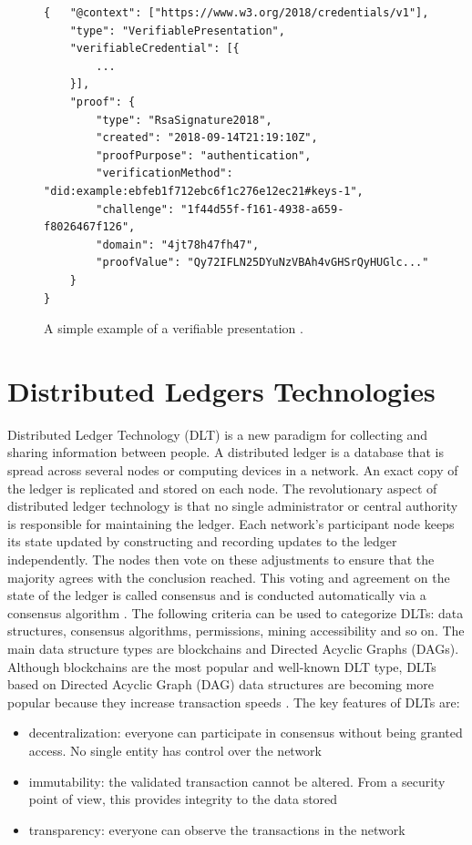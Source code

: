 \begin{figure}[h!]
\begin{lstlisting}[style=json, breaklines=true,frame=single]
{   "@context": ["https://www.w3.org/2018/credentials/v1"],
    "type": "VerifiablePresentation",
    "verifiableCredential": [{
        ...
    }],
    "proof": {
        "type": "RsaSignature2018",
        "created": "2018-09-14T21:19:10Z",
        "proofPurpose": "authentication",
        "verificationMethod": "did:example:ebfeb1f712ebc6f1c276e12ec21#keys-1",
        "challenge": "1f44d55f-f161-4938-a659-f8026467f126",
        "domain": "4jt78h47fh47",
        "proofValue": "Qy72IFLN25DYuNzVBAh4vGHSrQyHUGlc..."
    }
}   
\end{lstlisting}
\caption{A simple example of a verifiable presentation \cite{vcW3C}. \label{vpExample}}
\end{figure}
\section{Distributed Ledgers Technologies}

Distributed Ledger Technology (DLT)  is a new paradigm for collecting and sharing information between people. A distributed ledger is a database that is spread across several nodes or computing devices in a network. An exact copy of the ledger is replicated and stored on each node. The revolutionary aspect of distributed ledger technology is that no single administrator or central authority is responsible for maintaining the ledger. Each network's participant node keeps its state updated by constructing and recording updates to the ledger independently. The nodes then vote on these adjustments to ensure that the majority agrees with the conclusion reached. This voting and agreement on the state of the ledger is called consensus and is conducted automatically via a consensus algorithm \cite{dlt-intro-1}. 
The following criteria can be used to categorize DLTs: data structures, consensus algorithms, permissions, mining accessibility and so on. The main data structure types are blockchains and Directed Acyclic Graphs (DAGs). Although blockchains are the most popular and well-known DLT type,  DLTs based on Directed Acyclic Graph (DAG) data structures are becoming more popular because they increase transaction speeds \cite{dlt-intro-2}. 
The key features of DLTs are:
\begin{itemize}
    \item decentralization: everyone can participate in consensus without being granted access. No single entity has control over the network
    \item immutability: the validated transaction cannot be altered. From a security point of view, this provides integrity to the data stored
    \item transparency: everyone can observe the transactions in the network
\end{itemize}

